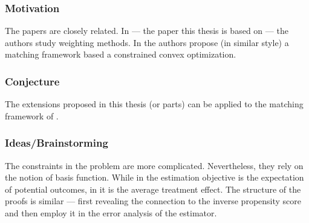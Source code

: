 \subsubsection*{Motivation}
The papers \cite{Wang2019,Wang2023} 
are closely related.
In \cite{Wang2019} --- the paper this thesis is based on ---
the authors study weighting methods.
In \cite{Wang2023} the authors propose (in similar style) a matching framework based a constrained convex optimization.
\subsubsection{Conjecture}
The extensions proposed in this thesis (or parts) can be applied to the matching framework of \cite{Wang2023}.
\subsubsection{Ideas/Brainstorming}
The constraints in the problem \cite[(2.1)]{Wang2023} are more complicated. Nevertheless, they rely on the notion of basis function.
While in \cite{Wang2019} the estimation objective is the expectation of potential outcomes, in \cite{Wang2023} it is the average treatment effect.
The structure of the proofs is similar --- first revealing the connection to the inverse propensity score and then employ it in the error analysis of the estimator.


